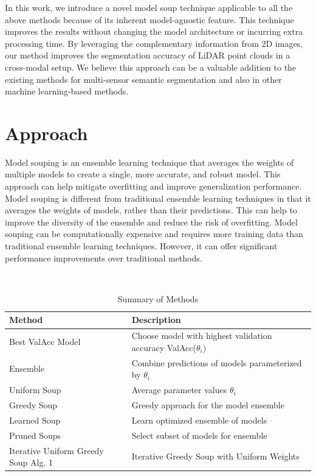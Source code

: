\documentclass[10pt,twocolumn,letterpaper]{article}
\begin{document}
In this work, we introduce a novel model soup \cite{wortsman2022model,dansereau2023model} technique applicable to all the above methods because of its inherent model-agnostic feature. 
This technique improves the results without changing the model architecture or incurring extra processing time. By leveraging the complementary information from 2D images, our method improves the segmentation accuracy of LiDAR point clouds in a cross-modal setup. We believe this approach can be a valuable addition to the existing methods for multi-sensor semantic segmentation and also in other machine learning-based methods.


\section{ Approach }
Model souping \cite{wortsman2022model,dansereau2023model} is an ensemble learning technique that averages the weights of multiple models to create a single, more accurate, and robust model. This approach can help mitigate overfitting and improve generalization performance. Model souping is different from traditional ensemble learning techniques in that it averages the weights of models, rather than their predictions. This can help to improve the diversity of the ensemble and reduce the risk of overfitting. Model souping can be computationally expensive and requires more training data than traditional ensemble learning techniques. However, it can offer significant performance improvements over traditional methods.
\begin{table}[!h]
\centering\
\small
\begin{tabular}{p{3.5cm} p{4cm}}
		\toprule
		\textbf{Method} & \textbf{Description} \\
		\midrule
		Best ValAcc Model & Choose model with highest validation accuracy ValAcc($\theta_i$) \\
		Ensemble & Combine predictions of models parameterized by $\theta_i$ \\
		Uniform Soup & Average parameter values $\theta_i$ \ \cite{wortsman2022model} \\
		Greedy Soup & Greedy approach for the model ensemble \cite{wortsman2022model}\\
		Learned Soup & Learn optimized ensemble of models \cite{wortsman2022model} \\
		Pruned Soups & Select subset of models for ensemble \cite{dansereau2023model} \\
		Iterative Uniform Greedy Soup Alg. 1 & Iterative Greedy Soup with Uniform Weights \\
		\bottomrule
	\end{tabular}
	\caption{Summary of Methods}
\end{table}
\end{document}
